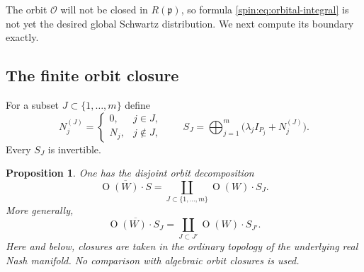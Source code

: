 \documentclass[11pt,reqno]{amsart}
\numberwithin{equation}{section}
\newtheorem{proposition}[theorem]{Proposition}
\theoremstyle{definition}
\theoremstyle{remark}
\newcommand{\Or}{\operatorname{O}}
\newcommand{\fp}{\mathfrak p}
\newcommand{\cO}{\mathcal O}
\begin{document}
The orbit $\cO$ will not be closed in $R(\fp)$, so formula
\eqref{spin:eq:orbital-integral} is not yet the desired global Schwartz
distribution.  We next compute its boundary exactly.

\subsection{The finite orbit closure}\label{spin:sec:closure}

For a subset $J\subset\{1,\ldots,m\}$ define
\begin{equation}\label{spin:eq:SJ}
  N_j^{(J)}=
  \begin{cases}
    0,&j\in J,\\
    N_j,&j\notin J,
  \end{cases}
  \qquad
  S_J=\bigoplus_{j=1}^m
  \bigl(\lambda_jI_{P_j}+N_j^{(J)}\bigr).
\end{equation}
Every $S_J$ is invertible.

\begin{proposition}\label{spin:prop:base-closure}
One has the disjoint orbit decomposition
\begin{equation}\label{spin:eq:base-closure}
  \overline{\Or(W)\cdot S}
  =
  \coprod_{J\subset\{1,\ldots,m\}}
  \Or(W)\cdot S_J.
\end{equation}
More generally,
\[
  \overline{\Or(W)\cdot S_J}
  =
  \coprod_{J\subset J'}\Or(W)\cdot S_{J'}.
\]
Here and below, closures are taken in the ordinary topology of the
underlying real Nash manifold.  No comparison with algebraic orbit closures
is used.
\end{proposition}
\end{document}
